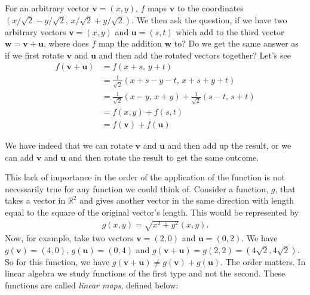 \noindent For an arbitrary vector $\mathbf{v}=(x,y)$, $f$ maps $\mathbf{v}$ to the coordinates $(x/\sqrt{2}-y/\sqrt{2}, \, x/\sqrt{2}+y/\sqrt{2})$. We then ask the question, if we have two arbitrary vectors $\mathbf{v}=(x,y)$ and $\mathbf{u}=(s,t)$ which add to the third vector $\mathbf{w} = \mathbf{v} + \mathbf{u}$, where does $f$ map the addition $\mathbf{w}$ to? Do we get the same answer as if we first rotate $\mathbf{v}$ and $\mathbf{u}$ and then add the rotated vectors together? Let's see
\begin{align*}
f(\mathbf{v}+\mathbf{u}) &= f(x+s, \, y+t) \\
&= \frac{1}{\sqrt{2}}(x+s - y-t, \, x+s+y+t) \\
&= \frac{1}{\sqrt{2}}(x-y, \, x+y) + \frac{1}{\sqrt{2}}(s-t, \, s+t) \\
&= f(x,y) + f(s,t)\\
&= f(\mathbf{v}) + f(\mathbf{u})
\end{align*}

\noindent We have indeed that we can rotate $\mathbf{v}$ and $\mathbf{u}$ and then add up the result, or we can add $\mathbf{v}$ and $\mathbf{u}$ and then rotate the result to get the same outcome. 

This lack of importance in the order of the application of the function is not necessarily true for any function we could think of. Consider a function, $g$, that takes a vector in $\mathbb{R}^2$ and gives another vector in the same direction with length equal to the square of the original vector's length. This would be represented by
\begin{align*}
g(x,y) = \sqrt{x^2 + y^2} (x,y).
\end{align*}
Now, for example, take two vectors $\mathbf{v}=(2,0)$ and $\mathbf{u}=(0,2)$. We have $g(\mathbf{v})=(4,0)$, $g(\mathbf{u})=(0,4)$ and $g(\mathbf{v}+\mathbf{u}) = g(2,2) = (4\sqrt{2},4\sqrt{2})$. So for this function, we have $g(\mathbf{v}+\mathbf{u}) \neq g(\mathbf{v})+g(\mathbf{u})$. The order matters. In linear algebra we study functions of the first type and not the second. These functions are called \textit{linear maps}, defined below:


